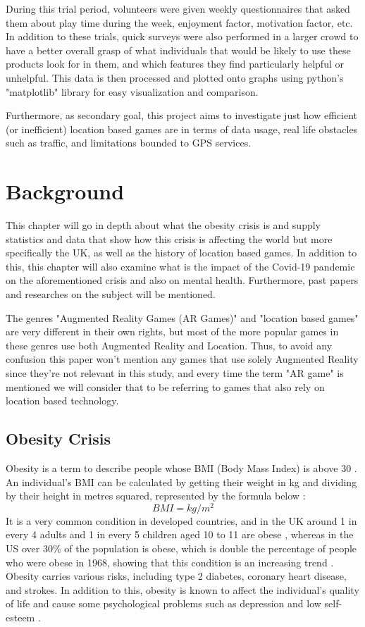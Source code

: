 \documentclass{dissertation}
\begin{document}
During this trial period, volunteers were given weekly questionnaires that asked them about play time during the week, 
enjoyment factor, motivation factor, etc. In addition to these trials, quick surveys were also performed in a larger crowd 
to have a better overall grasp of what individuals that would be likely to use these products look for in them, and which 
features they find particularly helpful or unhelpful. This data is then processed and plotted onto graphs using python's 
"matplotlib" library for easy visualization and comparison.

Furthermore, as secondary goal, this project aims to investigate just how efficient (or inefficient) location based games are 
in terms of data usage, real life obstacles such as traffic, and limitations bounded to GPS services.


\chapter{Background}

This chapter will go in depth about what the obesity crisis is and supply statistics and data that show how this crisis is affecting 
the world but more specifically the UK, as well as the history of location based games. In addition to this, this chapter will also examine what is 
the impact of the Covid-19 pandemic on the aforementioned crisis and also on mental health. Furthermore, past papers and researches 
on the subject will be mentioned.

The genres "Augmented Reality Games (AR Games)" and "location based games" are very different in their own rights, but most of the 
more popular games in these genres use both Augmented Reality and Location. Thus, to avoid any confusion this paper won't mention 
any games that use solely Augmented Reality since they're not relevant in this study, and every time the term "AR game" is mentioned 
we will consider that to be referring to games that also rely on location based technology.

\section{Obesity Crisis}

Obesity is a term to describe people whose BMI (Body Mass Index) is above 30 \citep{NHS19}. An individual's BMI can be calculated by 
getting their weight in kg and dividing by their height in metres squared, represented by the formula below \citep{Diabetes21}: 
\[BMI = kg / m^2\]
It is a very common condition in developed countries, and in the UK around 1 in every 4 adults and 1 in every 5 children aged 10 to 11 are obese
 \citep{NHS19}, whereas in the US over 30\% of the population is obese, which is double the percentage of people who were obese in 1968, showing 
that this condition is an increasing trend \citep{Frezza08}. Obesity carries various risks, including type 2 diabetes, coronary heart disease, 
and strokes. In addition to this, obesity is known to affect the individual's quality of life and cause some psychological problems such as depression 
and low self-esteem \citep{NHS19}.
\end{document}
